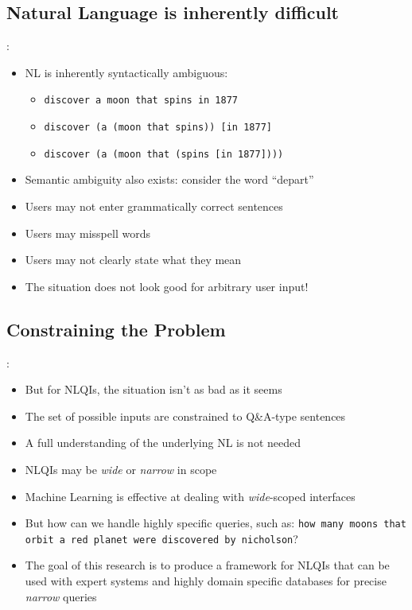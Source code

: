 \documentclass[logoontitle,tabu,supertabular,aspectratio=43]{preney-uwindsor-beamer}
\begin{document}
    \subsection{Natural Language is inherently difficult}
    \begin{frame}{\insertsection: \insertsubsection}
        \begin{itemize}
            \item NL is inherently syntactically ambiguous:
            \begin{itemize}
                \item \texttt{discover a moon that spins in 1877}
                \item \texttt{discover (a (moon that spins)) [in 1877]}
                \item \texttt{discover (a (moon that (spins [in 1877])))}
            \end{itemize}
            \item Semantic ambiguity also exists: consider the word ``depart''
            \item Users may not enter grammatically correct sentences
            \item Users may misspell words
            \item Users may not clearly state what they mean
            \item The situation does not look good for arbitrary user input!
        \end{itemize}
    \end{frame}

    \subsection{Constraining the Problem}
    \begin{frame}{\insertsection: \insertsubsection}
        \begin{itemize}
            \item But for NLQIs, the situation isn't as bad as it seems
            \item The set of possible inputs are constrained to Q\&A-type sentences
            \item A full understanding of the underlying NL is not needed
            \item NLQIs may be {\em wide} or {\em narrow} in scope
            \item Machine Learning is effective at dealing with {\em wide}-scoped interfaces
            \item But how can we handle highly specific queries, such as: \texttt{how many moons that orbit a red planet were discovered by nicholson}?
            \item The goal of this research is to produce a framework for NLQIs that can be used with expert systems and highly domain specific databases for precise {\em narrow} queries
        \end{itemize}
    \end{frame}
\end{document}
